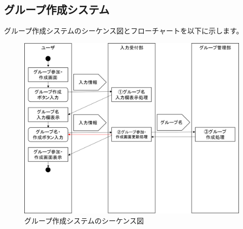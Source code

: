 \newpage
\subsection{グループ作成システム}
グループ作成システムのシーケンス図とフローチャートを以下に示します。

\begin{figure}[htbp]
  \begin{center}
    \includegraphics[width=1\linewidth,clip]{./img/create_group/main.png}
    \caption{グループ作成システムのシーケンス図}\label{fig:creategroupseaquence}
  \end{center}
\end{figure}

